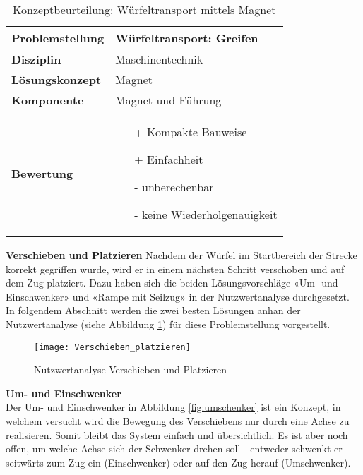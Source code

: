 \documentclass[../../main.tex]{subfiles}
\begin{document}
 \begin{flushleft}
    \begin{table}[h]
    \begin{tabular}{ | l | p{11cm} |}
    \hline
    \textbf{Problemstellung} & Würfeltransport: Greifen \\ \hline
    \textbf{Disziplin} & Maschinentechnik \\ \hline
    \textbf{Lösungskonzept} &  Magnet \\ \hline
    \textbf{Komponente} & Magnet und Führung \\ \hline
    \textbf{Bewertung} &  \begin{itemize}
                            \item[+] Kompakte Bauweise
                            \item[+] Einfachheit
                            \item[-] unberechenbar 
                            \item[-] keine Wiederholgenauigkeit
                          \end{itemize} \\ \hline
    \end{tabular}
    \caption{Konzeptbeurteilung: Würfeltransport mittels Magnet}
    \label{tab:konzept_wurfeltrransport_magnet}
\end{table}
\end{flushleft}
\textbf{Verschieben und Platzieren}
Nachdem der Würfel im Startbereich der Strecke korrekt gegriffen wurde, wird er in einem nächsten Schritt verschoben und auf dem Zug platziert. Dazu haben sich die beiden Lösungsvorschläge «Um- und Einschwenker» und «Rampe mit Seilzug» in der Nutzwertanalyse durchgesetzt. In folgendem Abschnitt werden die zwei besten Lösungen anhan der Nutzwertanalyse (siehe Abbildung \ref{fig:verschieben_platzieren}) für diese Problemstellung vorgestellt.

\begin{figure}[H] %
    \centering
    \texttt{[image: Verschieben\_platzieren]}
    \caption{Nutzwertanalyse Verschieben und Platzieren}
    \label{fig:verschieben_platzieren}
\end{figure}
\pagebreak
\textbf{Um- und Einschwenker}\\
Der Um- und Einschwenker in Abbildung \ref{fig:umschenker} ist ein Konzept, in welchem versucht wird die Bewegung des Verschiebens nur durch eine Achse zu realisieren. Somit bleibt das System einfach und übersichtlich. Es ist aber noch offen, um welche Achse sich der Schwenker drehen soll - entweder schwenkt er seitwärts zum Zug ein (Einschwenker) oder auf den Zug herauf (Umschwenker).
\end{document}
